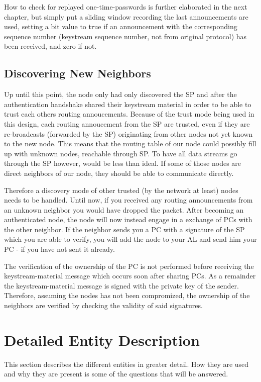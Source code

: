 How to check for replayed one-time-passwords is further elaborated in the next
chapter, but simply put a sliding window recording the last announcements are
used, setting a bit value to true if an announcement with the corresponding
sequence number (keystream sequence number, not from original protocol) has been
received, and zero if not.

\subsection{Discovering New Neighbors}
Up until this point, the node only had only discovered the \ac{SP} and after the
authentication handshake shared their keystream material in order to be able to
trust each others routing annoucements. Because of the trust mode being used in
this design, each routing annoucement from the \ac{SP} are trusted, even if they
are re-broadcasts (forwarded by the SP) originating from other nodes not yet
known to the new node. This means that the routing table of our node could
possibly fill up with unknown nodes, reachable through \ac{SP}. To have all
data streams go through the \ac{SP} however, would be less than ideal. If some
of those nodes are direct neighbors of our node, they should be able to
communicate directly.

Therefore a discovery mode of other trusted (by the network at least) nodes
needs to be handled. Until now, if you received any routing announcements
from an unknown neighbor you would have dropped the packet. After becoming an
authenticated node, the node will now instead engage in a exchange of \acp{PC}
with the other neighbor. If the neighbor sends you a \ac{PC} with a signature
of the \ac{SP} which you are able to verify, you will add the node to your
\ac{AL} and send him your \ac{PC} - if you have not sent it already.

The verification of the ownership of the \ac{PC} is not performed before
receiving the keystream-material message which occurs soon after sharing
\acp{PC}. As a remainder the keystream-material message is signed with the
private key of the sender. Therefore, assuming the nodes has not been
compromized, the ownership of the neighbors are verified by checking the
validity of said signatures.

\section{Detailed Entity Description}
This section describes the different entities in greater detail. How they are
used and why they are present is some of the questions that will be answered.

